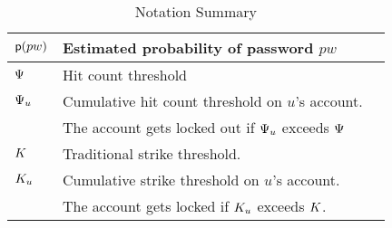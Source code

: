 \begin{table}[htb]
\begin{tabular}{|l|l|l|}
		$\textsf{p}(pw)$ & Estimated probability of password $pw$  \\\hline                    
		
		$\Psi$ & Hit count threshold \\\hline 
		
		$\Psi_{u}$ & Cumulative hit count threshold on $u$’s account. \\&The account gets locked out if $\Psi_{u}$ exceeds $\Psi$\\\hline
		
		$K$ & Traditional strike threshold. \\\hline
		
		$K_{u}$ & Cumulative strike threshold on $u$'s account. \\&The account gets locked if $K_{u}$ exceeds $K$. \\\hline
		
		
		
		
		
		
		
		
		
	\end{tabular}
	\vspace{-0.1cm}
	\caption{Notation Summary}\label{table: notation}
	\vspace{-0.2cm}
	
\end{table}



